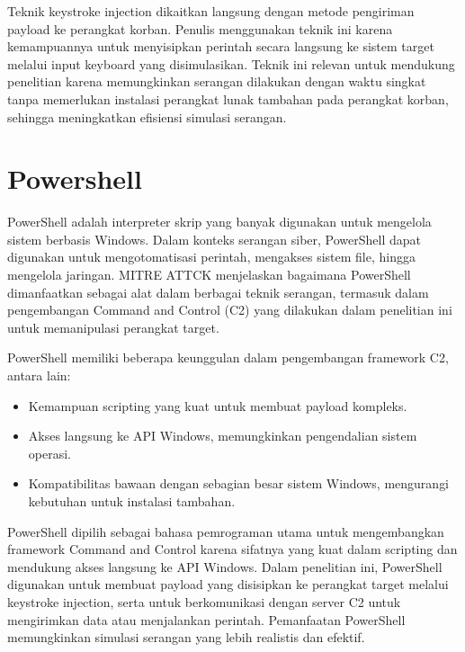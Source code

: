 Teknik keystroke injection dikaitkan langsung dengan metode pengiriman payload ke perangkat korban. Penulis menggunakan teknik ini karena kemampuannya untuk menyisipkan perintah secara langsung ke sistem target melalui input keyboard yang disimulasikan. Teknik ini relevan untuk mendukung penelitian karena memungkinkan serangan dilakukan dengan waktu singkat tanpa memerlukan instalasi perangkat lunak tambahan pada perangkat korban, sehingga meningkatkan efisiensi simulasi serangan. 

\section{Powershell}
PowerShell adalah interpreter skrip yang banyak digunakan untuk mengelola sistem berbasis Windows. Dalam konteks serangan siber, PowerShell dapat digunakan untuk mengotomatisasi perintah, mengakses sistem file, hingga mengelola jaringan. MITRE ATTCK \citep{mitre_powershell} menjelaskan bagaimana PowerShell dimanfaatkan sebagai alat dalam berbagai teknik serangan, termasuk dalam pengembangan Command and Control (C2) yang dilakukan dalam penelitian ini untuk memanipulasi perangkat target.


PowerShell memiliki beberapa keunggulan dalam pengembangan framework C2, antara lain:
\begin{itemize}
    \item Kemampuan scripting yang kuat untuk membuat payload kompleks.
    \item Akses langsung ke API Windows, memungkinkan pengendalian sistem operasi.
    \item Kompatibilitas bawaan dengan sebagian besar sistem Windows, mengurangi kebutuhan untuk instalasi tambahan. 
\end{itemize}


PowerShell dipilih sebagai bahasa pemrograman utama untuk mengembangkan framework Command and Control karena sifatnya yang kuat dalam scripting dan mendukung akses langsung ke API Windows. Dalam penelitian ini, PowerShell digunakan untuk membuat payload yang disisipkan ke perangkat target melalui keystroke injection, serta untuk berkomunikasi dengan server C2 untuk mengirimkan data atau menjalankan perintah. Pemanfaatan PowerShell memungkinkan simulasi serangan yang lebih realistis dan efektif. 
